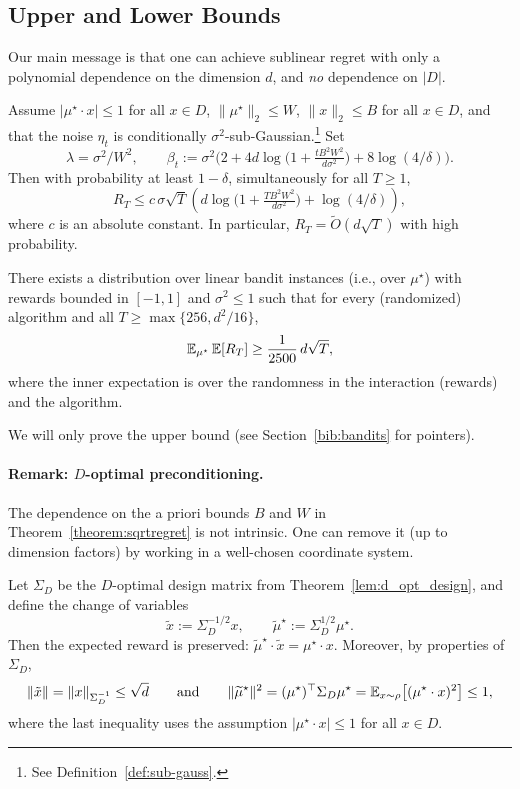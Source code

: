 \subsection{Upper and Lower Bounds}

Our main message is that one can achieve sublinear regret with only a polynomial
dependence on the dimension $d$, and \emph{no} dependence on $|D|$.

\begin{theorem}\label{theorem:sqrtregret}
Assume $|\mu^\star\cdot x|\le 1$ for all $x\in D$, $\|\mu^\star\|_2\le W$,
$\|x\|_2\le B$ for all $x\in D$, and that the noise $\eta_t$ is conditionally
$\sigma^2$-sub-Gaussian.\footnote{See Definition~\ref{def:sub-gauss}.}
Set
\[
\lambda = \sigma^2/W^2,
\qquad
\beta_t := \sigma^2\Big(2
+ 4 d\log\Big( 1 + \tfrac{tB^2W^2}{ d\sigma^2} \Big)
+ 8\log(4/\delta)\Big).
\]
Then with probability at least $1-\delta$, simultaneously for all $T\ge 1$,
\[
R_T \leq c\, \sigma \sqrt{T}\left( d\log\Big( 1 + \tfrac{TB^2W^2}{ d\sigma^2} \Big)
+ \log(4/\delta) \right),
\]
where $c$ is an absolute constant. In particular, $R_T = \tilde O(d\sqrt{T})$
with high probability.
\end{theorem}

\begin{theorem}
There exists a distribution over linear bandit instances (i.e., over $\mu^\star$)
with rewards bounded in $[-1,1]$ and $\sigma^2\le 1$ such that for every (randomized)
algorithm and all $T\ge \max\{256, d^2/16\}$,
\[
\mathbb{E}_{\mu^\star}\,\mathbb{E}[R_T] \ge \frac{1}{2500}\, d\sqrt{T},
\]
where the inner expectation is over the randomness in the interaction (rewards) and the algorithm.
\end{theorem}

We will only prove the upper bound (see Section~\ref{bib:bandits} for pointers).

\paragraph{Remark: $D$-optimal preconditioning.}
The dependence on the a priori bounds $B$ and $W$ in Theorem~\ref{theorem:sqrtregret}
is not intrinsic. One can remove it (up to dimension factors) by working in a
well-chosen coordinate system.

Let $\Sigma_D$ be the $D$-optimal design matrix from Theorem~\ref{lem:d_opt_design},
and define the change of variables
\[
\tilde x := \Sigma_D^{-1/2}x, \qquad \widetilde{\mu}^\star := \Sigma_D^{1/2}\mu^\star.
\]
Then the expected reward is preserved:
$\widetilde{\mu}^\star\cdot \tilde x = \mu^\star\cdot x$.
Moreover, by properties of $\Sigma_D$,
\[
\|\tilde x\| = \|x\|_{\Sigma_D^{-1}} \le \sqrt{d}
\qquad\text{and}\qquad
\|\widetilde{\mu}^\star\|^2 = (\mu^\star)^\top \Sigma_D \mu^\star
= \mathbb{E}_{x\sim\rho}\big[(\mu^\star\cdot x)^2\big]\le 1,
\]
where the last inequality uses the assumption $|\mu^\star\cdot x|\le 1$ for all $x\in D$.

